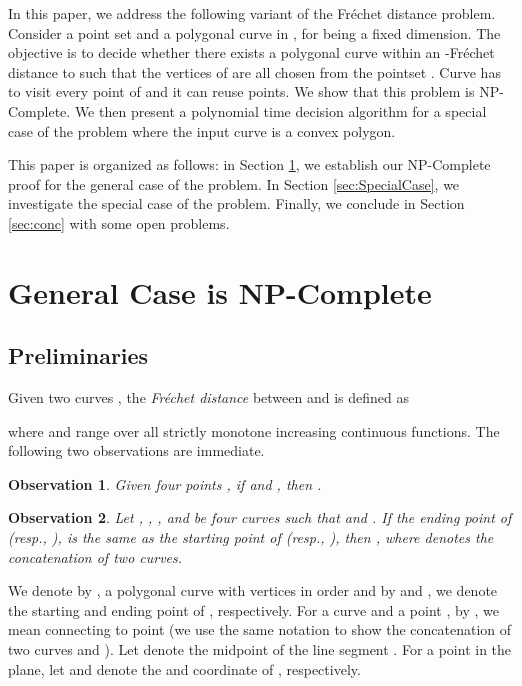 \documentclass[a4paper,UKenglish]{lipics}
\newcommand{\Frechet}{Fr\'echet }
\begin{document}
In this paper, we address the following variant of the \Frechet distance problem.
Consider a point set  and a polygonal curve  in , 
for  being a fixed dimension.
The objective is to decide whether there exists a polygonal curve  within an  -\Frechet
distance to  such that the vertices of  are all chosen from the 
pointset . Curve  has to visit every point of 
and it can reuse points. We show that this problem is NP-Complete. 
We then present a polynomial time decision algorithm for a 
special case of the problem where the input curve  is a convex polygon. 

This paper is organized as follows: in Section \ref{sec:NPComp}, 
we establish our NP-Complete proof for the general case of the problem. 
In Section \ref{sec:SpecialCase}, 
we investigate the special case of the problem.
Finally, we conclude in Section \ref{sec:conc} with some open problems.

\section{General Case is NP-Complete}
\label{sec:NPComp}

\subsection{Preliminaries}
Given two curves ,
the {\em \Frechet distance\/} between  and  is defined as

where  and  range over all strictly monotone increasing continuous functions.
The following two observations are immediate.

\newtheorem{obs}{Observation}

\begin{obs}\label{obs:simple}
	Given four points , if
	 and , then
	. 
\end{obs}




\begin{obs}\label{obs:concat}
Let , , , and  
	be four curves 
	such that  and
	. 
	If the ending point of  (resp., ), 
	is the same as 
	the starting point of   (resp., ),
	then ,
	where  denotes the concatenation of two curves.
\end{obs}





\vspace{0.2 in}
\hspace{-0.2 in}{\bf Notations.}
We denote by , a polygonal curve 
with vertices  in order 
and by  and , we denote 
the starting and ending point of , respectively.
For a curve  and a point , by , 
we mean connecting  to point 
(we use the same notation  to show the concatenation of 
two curves  and ).
Let  denote the  midpoint of the line segment . 
For a point  in the plane, let  and 
denote the  and  coordinate of , respectively.
\end{document}
